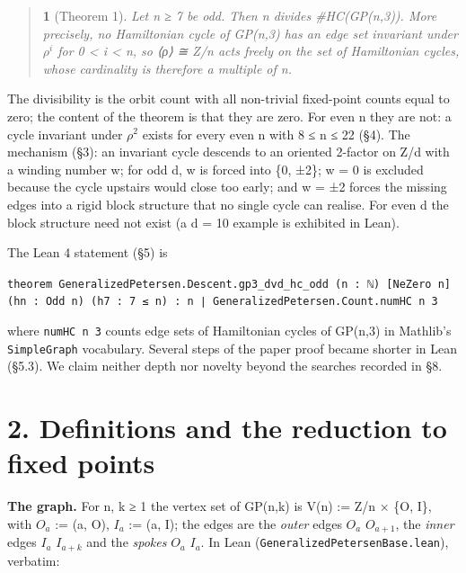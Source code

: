 \documentclass[11pt,a4paper]{article}
\theoremstyle{named}
\newtheorem*{namedthm}{}
\begin{document}
\begin{quote}
\begin{namedthm}[Theorem 1]
Let n ≥ 7 be odd. Then n divides \#HC(GP(n,3)). More precisely, no Hamiltonian cycle of GP(n,3) has an edge set invariant under $ρ^i$ for 0 \textless{} i \textless{} n, so ⟨ρ⟩ ≅ Z/n acts freely on the set of Hamiltonian cycles, whose cardinality is therefore a multiple of n.
\end{namedthm}
\end{quote}
The divisibility is the orbit count with all non-trivial fixed-point counts equal to zero; the content of the theorem is that they are zero. For even n they are not: a cycle invariant under $ρ^2$ exists for every even n with 8 ≤ n ≤ 22 (§4). The mechanism (§3): an invariant cycle descends to an oriented 2-factor on Z/d with a winding number w; for odd d, w is forced into \{0, ±2\}; w = 0 is excluded because the cycle upstairs would close too early; and w = ±2 forces the missing edges into a rigid block structure that no single cycle can realise. For even d the block structure need not exist (a d = 10 example is exhibited in Lean).

The Lean 4 statement (§5) is

\begin{leancode}
\item \texttt{theorem\ \allowbreak{}GeneralizedPetersen.\allowbreak{}Descent.\allowbreak{}gp3\_\allowbreak{}dvd\_\allowbreak{}hc\_\allowbreak{}odd\ \allowbreak{}(n\ \allowbreak{}:\ \allowbreak{}ℕ)\ \allowbreak{}[NeZero\ \allowbreak{}n]\ \allowbreak{}(hn\ \allowbreak{}:\ \allowbreak{}Odd\ \allowbreak{}n)\ \allowbreak{}(h7\ \allowbreak{}:\ \allowbreak{}7\ \allowbreak{}≤\ \allowbreak{}n)\ \allowbreak{}:\ \allowbreak{}n\ \allowbreak{}∣\ \allowbreak{}GeneralizedPetersen.\allowbreak{}Count.\allowbreak{}numHC\ \allowbreak{}n\ \allowbreak{}3}
\end{leancode}
where \texttt{numHC\ \allowbreak{}n\ \allowbreak{}3} counts edge sets of Hamiltonian cycles of GP(n,3) in Mathlib's \texttt{SimpleGraph} vocabulary. Several steps of the paper proof became shorter in Lean (§5.3). We claim neither depth nor novelty beyond the searches recorded in §8.

\section*{2. Definitions and the reduction to fixed points}
\textbf{The graph.} For n, k ≥ 1 the vertex set of GP(n,k) is V(n) := Z/n × \{O, I\}, with $O_a$ := (a, O), $I_a$ := (a, I); the edges are the \textit{outer} edges $O_a$ $O_{a+1}$, the \textit{inner} edges $I_a$ $I_{a+k}$ and the \textit{spokes} $O_a$ $I_a$. In Lean (\texttt{GeneralizedPetersenBase.\allowbreak{}lean}), verbatim:
\end{document}
